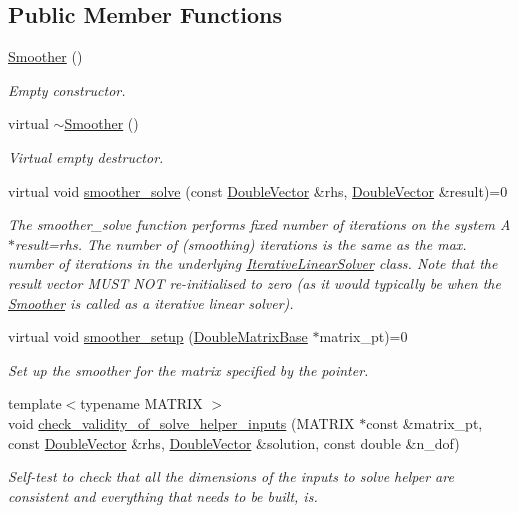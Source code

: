 \subsection*{Public Member Functions}
\begin{DoxyCompactItemize}
\item 
\hyperlink{classoomph_1_1Smoother_ae5c884d6c74054c5fdfe8a691293e3be}{Smoother} ()
\begin{DoxyCompactList}\small\item\em Empty constructor. \end{DoxyCompactList}\item 
virtual \hyperlink{classoomph_1_1Smoother_a225c288501a99fff61317957ea6adefa}{$\sim$\+Smoother} ()
\begin{DoxyCompactList}\small\item\em Virtual empty destructor. \end{DoxyCompactList}\item 
virtual void \hyperlink{classoomph_1_1Smoother_a94899c8d7bf84c068cda8d312d195bfe}{smoother\+\_\+solve} (const \hyperlink{classoomph_1_1DoubleVector}{Double\+Vector} \&rhs, \hyperlink{classoomph_1_1DoubleVector}{Double\+Vector} \&result)=0
\begin{DoxyCompactList}\small\item\em The smoother\+\_\+solve function performs fixed number of iterations on the system A$\ast$result=rhs. The number of (smoothing) iterations is the same as the max. number of iterations in the underlying \hyperlink{classoomph_1_1IterativeLinearSolver}{Iterative\+Linear\+Solver} class. Note that the result vector M\+U\+ST N\+OT re-\/initialised to zero (as it would typically be when the \hyperlink{classoomph_1_1Smoother}{Smoother} is called as a iterative linear solver). \end{DoxyCompactList}\item 
virtual void \hyperlink{classoomph_1_1Smoother_a6eb7009ab3bebcccc83062cbe980bf91}{smoother\+\_\+setup} (\hyperlink{classoomph_1_1DoubleMatrixBase}{Double\+Matrix\+Base} $\ast$matrix\+\_\+pt)=0
\begin{DoxyCompactList}\small\item\em Set up the smoother for the matrix specified by the pointer. \end{DoxyCompactList}\item 
{\footnotesize template$<$typename M\+A\+T\+R\+IX $>$ }\\void \hyperlink{classoomph_1_1Smoother_a26a3dba61218b77cf65775475dc8751d}{check\+\_\+validity\+\_\+of\+\_\+solve\+\_\+helper\+\_\+inputs} (M\+A\+T\+R\+IX $\ast$const \&matrix\+\_\+pt, const \hyperlink{classoomph_1_1DoubleVector}{Double\+Vector} \&rhs, \hyperlink{classoomph_1_1DoubleVector}{Double\+Vector} \&solution, const double \&n\+\_\+dof)
\begin{DoxyCompactList}\small\item\em Self-\/test to check that all the dimensions of the inputs to solve helper are consistent and everything that needs to be built, is. \end{DoxyCompactList}\end{DoxyCompactItemize}
